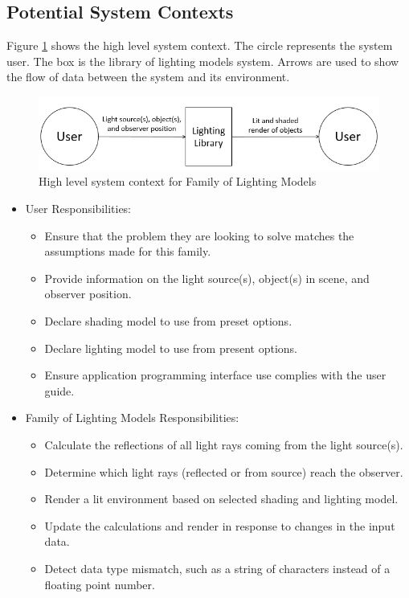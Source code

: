 \documentclass[12pt]{article}
\newcommand{\famname}{Family of Lighting Models} %
\begin{document}
\subsection{Potential System Contexts}
Figure \ref{fig:system-context} shows the high level system context. The circle 
represents the system user. The box is the library of lighting models system. 
Arrows are used to show the flow of data between the system and its environment.

\begin{figure}[h]
	\centering
	\includegraphics[scale=0.8]{./images/system-context}
	\caption{High level system context for \famname}
	\label{fig:system-context}
\end{figure}

\begin{itemize}
\item User Responsibilities:
\begin{itemize}
\item Ensure that the problem they are looking to solve matches the assumptions 
made for this family.
\item Provide information on the light source(s), object(s) in scene, and 
observer position.
\item Declare shading model to use from preset options.
\item Declare lighting model to use from present options.
\item Ensure application programming interface use complies with the user guide.
\end{itemize}
\item \famname{} Responsibilities:
\begin{itemize}
\item Calculate the reflections of all light rays coming from the light 
source(s).
\item Determine which light rays (reflected or from source) reach the observer.
\item Render a lit environment based on selected shading and lighting model.
\item Update the calculations and render in response to changes in the input 
data.
\item Detect data type mismatch, such as a string of characters instead of a
  floating point number.
\end{itemize}
\end{itemize}
\end{document}
